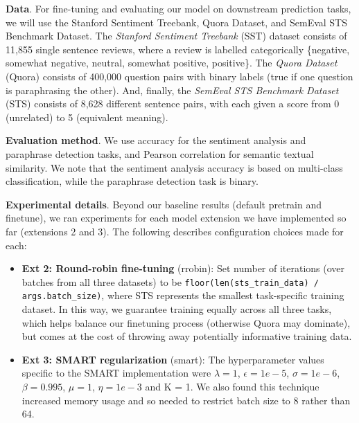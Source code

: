 \documentclass{article}
\begin{document}
\textbf{Data}. For fine-tuning and evaluating our model on downstream prediction tasks, we will use the Stanford Sentiment Treebank, Quora Dataset, and SemEval STS Benchmark Dataset. The \emph{Stanford Sentiment Treebank} (SST) dataset consists of 11,855 single sentence reviews, where a review is labelled categorically \{negative, somewhat negative, neutral, somewhat positive, positive\}. The \emph{Quora Dataset} (Quora) consists of 400,000 question pairs with binary labels (true if one question is paraphrasing the other). And, finally, the \emph{SemEval STS Benchmark Dataset} (STS) consists of 8,628 different sentence pairs, with each given a score from 0 (unrelated) to 5 (equivalent meaning). 


\textbf{Evaluation method}. We use accuracy for the sentiment analysis and paraphrase detection tasks, and Pearson correlation for semantic textual similarity. We note that the sentiment analysis accuracy is based on multi-class classification, while the paraphrase detection task is binary. 

\textbf{Experimental details}. Beyond our baseline results (default pretrain and finetune), we ran experiments for each model extension we have implemented so far (extensions 2 and 3). The following describes configuration choices made for each:

\begin{itemize}
    \item \textbf{Ext 2: Round-robin fine-tuning} (rrobin): Set number of iterations (over batches from all three datasets) to be \texttt{floor(len(sts\_train\_data) / args.batch\_size)}, where STS represents the smallest task-specific training dataset. In this way, we guarantee training equally across all three tasks, which helps balance our finetuning process (otherwise Quora may dominate), but comes at the cost of throwing away potentially informative training data. \\
    
    \item \textbf{Ext 3: SMART regularization} (smart): The hyperparameter values specific to the SMART implementation were $\lambda = 1$, $\epsilon = 1e-5$, $\sigma = 1e-6$, $\beta = 0.995$, $\mu = 1$, $\eta = 1e-3$ and K = 1. We also found this technique increased memory usage and so needed to restrict batch size to 8 rather than 64. 
\end{itemize}
\end{document}
